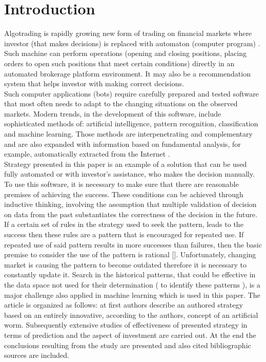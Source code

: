\documentclass[runningheads,a4paper]{llncs}
\begin{document}
\section{Introduction}

Algotrading is rapidly growing new form of trading on financial markets where investor (that makes decisions) is replaced with automaton (computer program) \cite{Leshik2011}. Such machine can perform operations (opening and closing positions, placing orders to open such positions that meet certain conditions) directly in an automated brokerage platform environment. It may also be a recommendation system that helps investor with making correct decisions.\\

Such computer applications (bots) require carefully prepared and tested software that most often needs to adapt to the changing situations on the observed markets. Modern trends, in the development of this software, include sophisticated methods of: artificial intelligence, pattern recognition, classification and machine learning. Those methods are interpenetrating and complementary and are also expanded with information based on fundamental analysis, for example, automatically extracted from the Internet \cite{elder}\cite{Wilinski2014}\cite{Schwager1996}.\\

Strategy presented in this paper is an example of a solution that can be used fully automated or with investor’s assistance, who makes the decision manually. To use this software, it is necessary to make sure that there are reasonable premises of achieving the success. These conditions can be achieved through inductive thinking, involving the assumption that multiple validation of decision on data from the past substantiates the correctness of the decision in the future. If a certain set of rules in the strategy used to seek the pattern, leads to the success then these rules are a pattern that is encouraged for repeated use. If repeated use of said pattern results in more successes than failures, then the basic premise to consider the use of the pattern is rational []. Unfortunately, changing market is causing the pattern to become outdated therefore it is necessary to constantly update it. Search in the historical patterns, that could be effective in the data space not used for their determination ( to identify these patterns ), is a major challenge also applied in machine learning which is used in this paper.
The article is organized as follows: at first authors describe an authored strategy based on an entirely innovative, according to the authors, concept of an artificial worm. Subsequently extensive studies of effectiveness of presented strategy in terms of prediction and the aspect of investment are carried out. At the end the conclusions resulting from the study are presented and also cited bibliographic sources are included.
\end{document}
